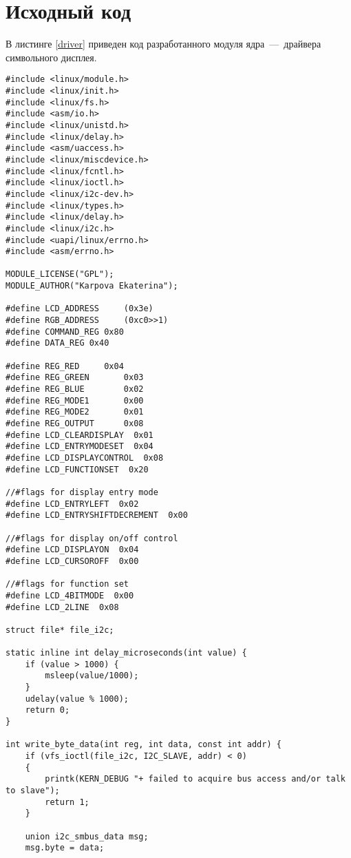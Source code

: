 \begin{appendices}
\label{appendix:graph}
	\chapter{Исходный код}
	
	В листинге \ref{driver} приведен код разработанного модуля ядра~---~драйвера символьного дисплея.
	
	\begin{lstlisting}[label=driver,caption=Код модуля ядра~---~драйвера символьного дисплея]
#include <linux/module.h>
#include <linux/init.h>
#include <linux/fs.h>
#include <asm/io.h>
#include <linux/unistd.h>
#include <linux/delay.h>
#include <asm/uaccess.h>
#include <linux/miscdevice.h>
#include <linux/fcntl.h>
#include <linux/ioctl.h>
#include <linux/i2c-dev.h>
#include <linux/types.h>
#include <linux/delay.h>
#include <linux/i2c.h>
#include <uapi/linux/errno.h>
#include <asm/errno.h>

MODULE_LICENSE("GPL");
MODULE_AUTHOR("Karpova Ekaterina");

#define LCD_ADDRESS     (0x3e)
#define RGB_ADDRESS     (0xc0>>1)
#define COMMAND_REG 0x80
#define DATA_REG 0x40

#define REG_RED     0x04
#define REG_GREEN       0x03
#define REG_BLUE        0x02
#define REG_MODE1       0x00
#define REG_MODE2       0x01
#define REG_OUTPUT      0x08
#define LCD_CLEARDISPLAY  0x01
#define LCD_ENTRYMODESET  0x04
#define LCD_DISPLAYCONTROL  0x08
#define LCD_FUNCTIONSET  0x20

//#flags for display entry mode
#define LCD_ENTRYLEFT  0x02
#define LCD_ENTRYSHIFTDECREMENT  0x00

//#flags for display on/off control
#define LCD_DISPLAYON  0x04
#define LCD_CURSOROFF  0x00

//#flags for function set
#define LCD_4BITMODE  0x00
#define LCD_2LINE  0x08

struct file* file_i2c;

static inline int delay_microseconds(int value) {
    if (value > 1000) {
        msleep(value/1000);
    }
    udelay(value % 1000);
    return 0;
}

int write_byte_data(int reg, int data, const int addr) {
    if (vfs_ioctl(file_i2c, I2C_SLAVE, addr) < 0)
    {
        printk(KERN_DEBUG "+ failed to acquire bus access and/or talk to slave");
        return 1;
    }

    union i2c_smbus_data msg;
    msg.byte = data;


\end{lstlisting}
\end{appendices}
